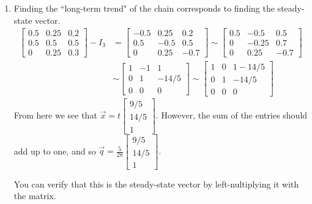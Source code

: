 \begin{enumerate}
\begin{enumerate}
{				code-for-first-row=\color{teal},
				code-for-first-col=\color{purple},
			}
			\[
				\begin{bNiceMatrix}[first-row,first-col]
				   	&   A   &   B   &    C   \\
				     A & 0.5  & 0.25 & 0.2 \\
				     B & 0.5  &  0.5  & 0.5 \\
				     C &  0   &  0.25 & 0.3
				\end{bNiceMatrix}
			\]
			The states in teal denote the {\color{teal} from}, and the states in purple denote the states that {\color{purple} receive}.
		\item Finding the ``long-term trend" of the chain corresponds to finding the steady-state vector. 
			\begin{align*}
				\begin{bmatrix}0.5 & 0.25 & 0.2 \\ 0.5 & 0.5 & 0.5 \\ 0 & 0.25 & 0.3\end{bmatrix} - I_3 &= 
				\begin{bmatrix}-0.5 & 0.25 & 0.2 \\ 0.5 & -0.5 & 0.5 \\ 0 & 0.25 & -0.7\end{bmatrix} 
				\sim \begin{bmatrix}0.5 & -0.5 & 0.5 \\ 0 & -0.25 & 0.7 \\ 0 & 0.25 & -0.7\end{bmatrix} \\[0.5em]
				&\sim \begin{bmatrix}1 & -1 & 1 \\ 0 & 1 & - 14/5 \\ 0 & 0 & 0\end{bmatrix} 
				\sim \begin{bmatrix}1 & 0 & 1 - 14/5 \\ 0 & 1 & -14/5 \\ 0 & 0 & 0\end{bmatrix}
			\end{align*}
			From here we see that \(\vec{x} = t\begin{bmatrix}9/5 \\ 14/5 \\ 1\end{bmatrix}.\) However, the sum of the entries should add up to one, and
			so \(\vec{q} = \displaystyle \frac{5}{28}\begin{bmatrix}9/5 \\ 14/5 \\ 1\end{bmatrix}.\)

			You can verify that this is the steady-state vector by left-nultiplying it with the matrix.
	\end{enumerate}
\end{enumerate}